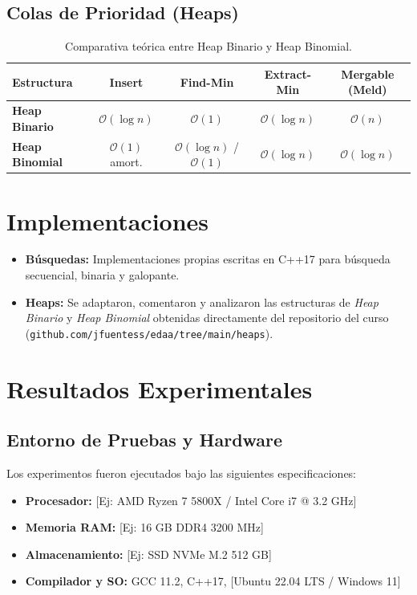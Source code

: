 \documentclass[11pt,a4paper]{article}
\begin{document}
\subsection{Colas de Prioridad (Heaps)}
\begin{table}[h!]
    \centering
    \caption{Comparativa teórica entre Heap Binario y Heap Binomial.}
    \label{tab:complejidad_heaps}
    \begin{tabular}{lcccc}
        \toprule
        \textbf{Estructura} & \textbf{Insert} & \textbf{Find-Min} & \textbf{Extract-Min} & \textbf{Mergable (Meld)} \\
        \midrule
        \textbf{Heap Binario} & $\mathcal{O}(\log n)$ & $\mathcal{O}(1)$ & $\mathcal{O}(\log n)$ & $\mathcal{O}(n)$ \\
        \textbf{Heap Binomial} & $\mathcal{O}(1)$ amort. & $\mathcal{O}(\log n)$ / $\mathcal{O}(1)$ & $\mathcal{O}(\log n)$ & $\mathcal{O}(\log n)$ \\
        \bottomrule
    \end{tabular}
\end{table}

\section{Implementaciones}
\begin{itemize}
    \item \textbf{Búsquedas:} Implementaciones propias escritas en C++17 para búsqueda secuencial, binaria y galopante.
    \item \textbf{Heaps:} Se adaptaron, comentaron y analizaron las estructuras de \emph{Heap Binario} y \emph{Heap Binomial} obtenidas directamente del repositorio del curso (\texttt{github.com/jfuentess/edaa/tree/main/heaps}).
\end{itemize}

\section{Resultados Experimentales}

\subsection{Entorno de Pruebas y Hardware}
Los experimentos fueron ejecutados bajo las siguientes especificaciones:
\begin{itemize}
    \item \textbf{Procesador:} [Ej: AMD Ryzen 7 5800X / Intel Core i7 @ 3.2 GHz]
    \item \textbf{Memoria RAM:} [Ej: 16 GB DDR4 3200 MHz]
    \item \textbf{Almacenamiento:} [Ej: SSD NVMe M.2 512 GB]
    \item \textbf{Compilador y SO:} GCC 11.2, C++17, [Ubuntu 22.04 LTS / Windows 11]
\end{itemize}
\end{document}
